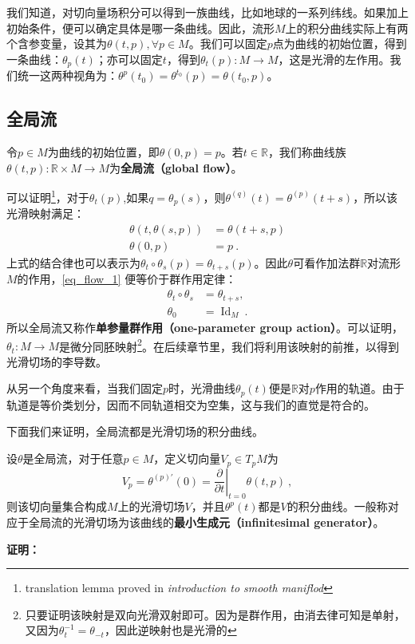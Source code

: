 

我们知道，对切向量场积分可以得到一族曲线，比如地球的一系列纬线。如果加上初始条件，便可以确定具体是哪一条曲线。因此，流形$M$上的积分曲线实际上有两个含参变量，设其为$\theta(t,p),\forall p\in M$。我们可以固定$p$点为曲线的初始位置，得到一条曲线：$\theta_p(t)$；亦可以固定$t$，得到$\theta_t(p):M\rightarrow M$，这是光滑的左作用。我们统一这两种视角为：$\theta^p(t_0)=\theta^{t_0}(p)=\theta(t_0,p)$。
\subsection{全局流}
令$p\in M$为曲线的初始位置，即$\theta(0,p)=p$。若$t\in\mathbb R$，我们称曲线族$\theta(t,p):\mathbb R\times M\rightarrow M$为\textbf{全局流（global flow）}。

可以证明\footnote{translation lemma proved in \textsl{introduction to smooth maniflod}}，对于$\theta_t(p)$,如果$q=\theta_p(s)$，则$\theta^{(q)}(t)=\theta^{(p)}(t+s)$，所以该光滑映射满足：
\begin{equation}\label{eq_flow_1}
\begin{aligned}
\theta(t, \theta(s, p)) & =\theta(t+s, p) \\
\theta(0, p) & =p~.
\end{aligned}
\end{equation}
上式的结合律也可以表示为$\theta_t \circ \theta_s(p)=\theta_{t+s}(p)$。因此$\theta$可看作加法群$\mathbb R$对流形$M$的作用，\autoref{eq_flow_1} 便等价于群作用定律：
\begin{equation}
\begin{aligned}
\theta_t \circ \theta_s & =\theta_{t+s}, \\
\theta_0 & =\operatorname{Id}_M~.
\end{aligned}
\end{equation}
所以全局流又称作\textbf{单参量群作用（one-parameter group action）}。可以证明，$\theta_t:M\rightarrow M$是微分同胚映射\footnote{只要证明该映射是双向光滑双射即可。因为是群作用，由消去律可知是单射，又因为$\theta^{-1}_t=\theta_{-t}$，因此逆映射也是光滑的}。在后续章节里，我们将利用该映射的前推，以得到光滑切场的李导数。


从另一个角度来看，当我们固定$p$时，光滑曲线$\theta_p(t)$便是$\mathbb R$对$p$作用的轨道。由于轨道是等价类划分，因而不同轨道相交为空集，这与我们的直觉是符合的。

下面我们来证明，全局流都是光滑切场的积分曲线。
\begin{theorem}{}
设$\theta$是全局流，对于任意$p\in M$，定义切向量$V_p\in T_p M$为
\begin{equation}
V_p=\theta^{(p) \prime}(0)=\left.\frac{\partial}{\partial t}\right|_{t=0} \theta(t, p) ~,
\end{equation}
则该切向量集合构成$M$上的光滑切场$V$，并且$\theta^p(t)$都是$V$的积分曲线。一般称对应于全局流的光滑切场为该曲线的\textbf{最小生成元（infinitesimal
generator）}。
\end{theorem}
\textbf{证明：}

